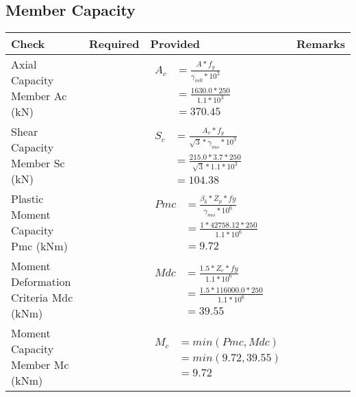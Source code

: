 \documentclass{article}%
\begin{document}
\subsection{Member Capacity}%
\label{subsec:MemberCapacity}%
\renewcommand{\arraystretch}{1.2}%
\begin{longtable}{|p{4cm}|p{5cm}|p{5.5cm}|p{1.5cm}|}%
\hline%
\rowcolor{OsdagGreen}%
Check&Required&Provided&Remarks\\%
\hline%
\endhead%
\hline%
Axial Capacity Member Ac (kN)&&$\begin{aligned} A_c &=\frac{A*f_y}{\gamma_{m0} *10^3}\\ &=\frac{1630.0*250}{1.1* 10^3}\\ &=370.45\end{aligned}$&\\%
\hline%
Shear Capacity Member Sc (kN)&&$\begin{aligned} S_c &= \frac{A_v*f_y}{\sqrt{3}*\gamma_{mo} *10^3}\\ &=\frac{215.0*3.7*250}{\sqrt{3}*1.1 *10^3}\\ &=104.38\end{aligned}$&\\%
\hline%
Plastic Moment Capacity Pmc (kNm)&&$\begin{aligned} Pmc &= \frac{\beta_b * Z_p *fy}{\gamma_{mo} * 10^6}\\ &=\frac{1*42758.12*250}{1.1 * 10^6}\\ &=9.72\end{aligned}$&\\%
\hline%
Moment Deformation Criteria Mdc (kNm)&&$\begin{aligned} Mdc &= \frac{1.5 *Z_e *fy}{1.1* 10^6}\\ &= \frac{1.5 *116000.0*250}{1.1* 10^6}\\ &= 39.55\end{aligned}$&\\%
\hline%
Moment Capacity Member Mc (kNm)&&$\begin{aligned} M_c &= min(Pmc,Mdc)\\ &=min(9.72,39.55)\\ &=9.72\end{aligned}$&\\%
\hline%
\end{longtable}

%
\newpage%
\end{document}
